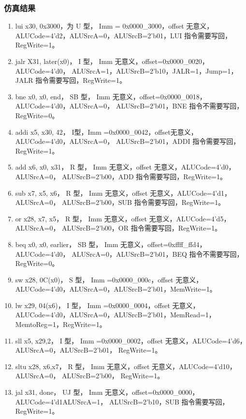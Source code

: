 \documentclass{../source/Experiment}
\begin{document}
\subsubsection{仿真结果}
\begin{enumerate}
    \item lui x30, 0x3000，为 U 型， Imm = 0x0000\_3000，offset 无意义，ALUCode=4’d2，ALUSrcA=0，ALUSrcB=2’b01，LUI 指令需要写回，RegWrite=1。
    \item jalr X31, later(x0)， I 型， Imm 无意义，offset=0x0000\_0020，ALUCode=4’d0，
          ALUSrcA=1，ALUSrcB=2’b10，JALR=1，Jump=1，JALR 指令需要写回，RegWrite=1。
    \item bne x0, x0, end， SB 型， Imm 无意义，offset=0x0000\_0018，ALUCode=4’d0，ALUSrcA=0，
          ALUSrcB=2’b01，BNE 指令不需要写回，RegWrite=0。
    \item addi x5, x30, 42， I型，Imm =0x0000\_0042，offset无意义，ALUCode=4’d0，ALUSrcA=0，
          ALUSrcB=2’b01，ADDI 指令需要写回，RegWrite=1。
    \item add x6, x0, x31， R 型， Imm 无意义，offset 无意义，ALUCode=4’d0，ALUSrcA=0，
          ALUSrcB=2’b00，ADD 指令需要写回，RegWrite=1。
    \item sub x7, x5, x6， R 型， Imm 无意义，offset 无意义，ALUCode=4’d1，ALUSrcA=0，
          ALUSrcB=2’b00，SUB 指令需要写回，RegWrite=1。
    \item or x28, x7, x5， R 型， Imm 无意义，offset 无意义，ALUCode=4’d5，ALUSrcA=0，
          ALUSrcB=2’b00，OR 指令需要写回，RegWrite=1。
    \item beq x0, x0, earlier， SB 型， Imm 无意义，offset=0xffff\_ffd4，ALUCode=4’d0，
          ALUSrcA=0，ALUSrcB=2’b01，BEQ 指令不需要写回，RegWrite=0。
    \item sw x28, 0C(x0)， S 型， Imm =0x0000\_000c，offset 无意义，ALUCode=4’d0，ALUSrcA=0，ALUSrcB=2’b01，MemWrite=1。
    \item lw x29, 04(x6)， I 型， Imm =0x0000\_0004，offset 无意义，ALUCode=4’d0，ALUSrcA=0，ALUSrcB=2’b01，MemRead=1，MemtoReg=1，RegWrite=1。
    \item sll x5, x29,2， I 型， Imm =0x0000\_0002，offset 无意义，ALUCode=4’d6，ALUSrcA=0，ALUSrcB=2’b01， RegWrite=1。
    \item sltu x28, x6,x7， R 型， Imm 无意义，offset 无意义，ALUCode=4’d10，ALUSrcA=0，
          ALUSrcB=2’b00， RegWrite=1。
    \item jal x31, done， UJ 型， Imm 无意义，offset=0x0000\_0000，ALUCode=4’d1ALUSrcA=1，
          ALUSrcB=2’b10，SUB 指令需要写回，RegWrite=1。
\end{enumerate}
\end{document}
